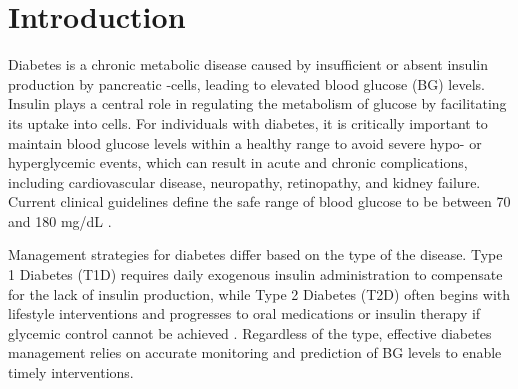 
\section{Introduction}
\begin{comment}
\end{comment}



Diabetes is a chronic metabolic disease caused by insufficient or absent insulin production by pancreatic -cells, leading to elevated blood glucose (BG) levels. Insulin plays a central role in regulating the metabolism of glucose by facilitating its uptake into cells. For individuals with diabetes, it is critically important to maintain blood glucose levels within a healthy range to avoid severe hypo- or hyperglycemic events, which can result in acute and chronic complications, including cardiovascular disease, neuropathy, retinopathy, and kidney failure\cite{world_health_organization_global_2016}. Current clinical guidelines define the safe range of blood glucose to be between 70 and 180 mg/dL \cite{noauthor_time_2021}.

Management strategies for diabetes differ based on the type of the disease. Type 1 Diabetes (T1D) requires daily exogenous insulin administration to compensate for the lack of insulin production, while Type 2 Diabetes (T2D) often begins with lifestyle interventions and progresses to oral medications or insulin therapy if glycemic control cannot be achieved \cite{bilous_handbook_2021}. Regardless of the type, effective diabetes management relies on accurate monitoring and prediction of BG levels to enable timely interventions.

